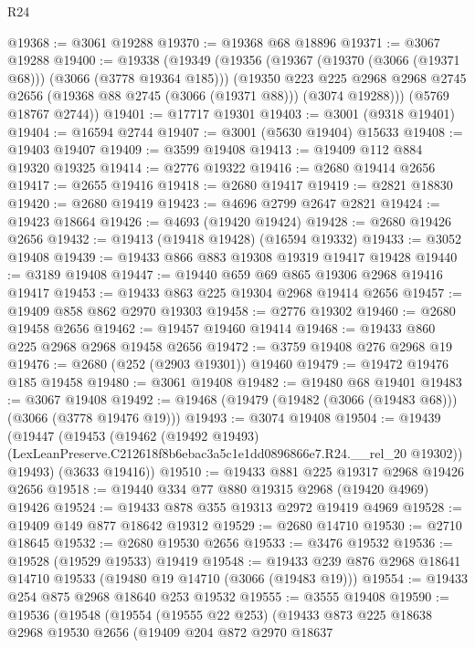 \begin{lexlean}{R24}
\begin{coremodule}
@19368 := @3061 @19288
@19370 := @19368 @68 @18896
@19371 := @3067 @19288
@19400 := @19338
    (@19349
      (@19356
        (@19367 (@19370 (@3066 (@19371 @68))) (@3066 (@3778 @19364 @185)))
        (@19350
          @223
          @225
          @2968
          @2968
          @2745
          @2656
          (@19368 @88 @2745 (@3066 (@19371 @88)))
          (@3074 @19288)))
      (@5769 @18767 @2744))
@19401 := @17717 @19301
@19403 := @3001 (@9318 @19401)
@19404 := @16594 @2744
@19407 := @3001 (@5630 @19404) @15633
@19408 := @19403 @19407
@19409 := @3599 @19408
@19413 := @19409 @112 @884 @19320 @19325
@19414 := @2776 @19322
@19416 := @2680 @19414 @2656
@19417 := @2655 @19416
@19418 := @2680 @19417
@19419 := @2821 @18830
@19420 := @2680 @19419
@19423 := @4696 @2799 @2647 @2821
@19424 := @19423 @18664
@19426 := @4693 (@19420 @19424)
@19428 := @2680 @19426 @2656
@19432 := @19413 (@19418 @19428) (@16594 @19332)
@19433 := @3052 @19408
@19439 := @19433 @866 @883 @19308 @19319 @19417 @19428
@19440 := @3189 @19408
@19447 := @19440 @659 @69 @865 @19306 @2968 @19416 @19417
@19453 := @19433 @863 @225 @19304 @2968 @19414 @2656
@19457 := @19409 @858 @862 @2970 @19303
@19458 := @2776 @19302
@19460 := @2680 @19458 @2656
@19462 := @19457 @19460 @19414
@19468 := @19433 @860 @225 @2968 @2968 @19458 @2656
@19472 := @3759 @19408 @276 @2968 @19
@19476 := @2680 (@252 (@2903 @19301)) @19460
@19479 := @19472 @19476 @185 @19458
@19480 := @3061 @19408
@19482 := @19480 @68 @19401
@19483 := @3067 @19408
@19492 := @19468 (@19479 (@19482 (@3066 (@19483 @68))) (@3066 (@3778 @19476 @19)))
@19493 := @3074 @19408
@19504 := @19439
    (@19447
      (@19453
        (@19462
          (@19492 @19493)
          (LexLeanPreserve.C212618f8b6ebac3a5c1e1dd0896866e7.R24.__rel_20 @19302))
        @19493)
      (@3633 @19416))
@19510 := @19433 @881 @225 @19317 @2968 @19426 @2656
@19518 := @19440 @334 @77 @880 @19315 @2968 (@19420 @4969) @19426
@19524 := @19433 @878 @355 @19313 @2972 @19419 @4969
@19528 := @19409 @149 @877 @18642 @19312
@19529 := @2680 @14710
@19530 := @2710 @18645
@19532 := @2680 @19530 @2656
@19533 := @3476 @19532
@19536 := @19528 (@19529 @19533) @19419
@19548 := @19433 @239 @876 @2968 @18641 @14710 @19533 (@19480 @19 @14710 (@3066 (@19483 @19)))
@19554 := @19433 @254 @875 @2968 @18640 @253 @19532
@19555 := @3555 @19408
@19590 := @19536
    (@19548
      (@19554
        (@19555 @22 @253)
        (@19433
          @873
          @225
          @18638
          @2968
          @19530
          @2656
          (@19409
            @204
            @872
            @2970
            @18637

\end{coremodule}
\end{lexlean}
